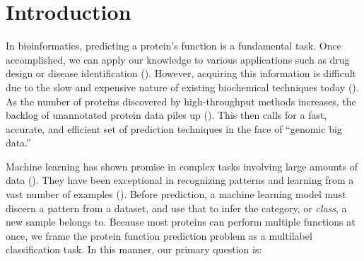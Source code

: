%
%
%
%
%

\chapter{Introduction}
\label{Introduction}

\par In bioinformatics, predicting a protein's function is a fundamental
task. Once accomplished, we can apply our knowledge to various applications
such as drug design or disease identification
(\cite{baldi2001bioinformatics}). However, acquiring this information is
difficult due to the slow and expensive nature of existing biochemical
techniques today (\cite{cozzetto2017computational}). As the number of
proteins discovered by high-throughput methods increases, the backlog of
unannotated protein data piles up (\cite{gaudet2017gene}). This then calls
for a fast, accurate, and efficient set of prediction techniques in the face
of ``genomic big data.''
  
\par Machine learning has shown promise in complex tasks involving large
amounts of data (\cite{chen2014data}). They have been exceptional in
recognizing patterns and learning from a vast number of examples
(\cite{lecun2015deep}). Before prediction, a machine learning model must
discern a pattern from a dataset, and use that to infer the category, or
\textit{class}, a new sample belongs to. Because most proteins can perform
multiple functions at once, we frame the protein function prediction problem
as a multilabel classification task. In this manner, our primary question
is:

